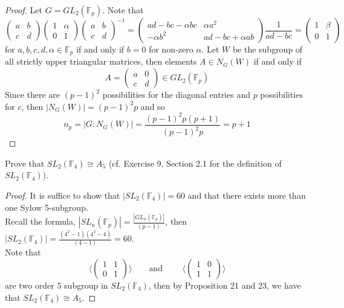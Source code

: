 \documentclass{article}
\newcommand{\F}{\mathbb{F}}
\newenvironment{problem}[2][Problem]{\begin{trivlist}
\item[\hskip \labelsep {\bfseries #1}\hskip \labelsep {\bfseries #2.}]}{\end{trivlist}}
\begin{document}
\begin{proof}
    Let $G=GL_2(\F_p)$. Note that 
    \[
    \begin{pmatrix}
        a & b \\
        c & d
    \end{pmatrix}
    \begin{pmatrix}
        1 & \alpha\\
        0 & 1
    \end{pmatrix}
    \begin{pmatrix}
        a & b\\
        c & d
    \end{pmatrix}^{-1}=\begin{pmatrix}
        ad-bc-\alpha bc & \alpha a^2\\
        -\alpha b^2 & ad-bc+\alpha ab
    \end{pmatrix}\frac{1}{ad-bc}= \begin{pmatrix}
        1 & \beta \\
        0 & 1
    \end{pmatrix}
    \]
    for $a, b, c, d, \alpha\in \F_p$ if and only if $b=0$ for non-zero $\alpha$. Let $W$ be the subgroup of all strictly upper triangular matrices, then elements 
    $A\in  N_{G}(W)$ if and only if 
    \[
        A=\begin{pmatrix}
            a & 0 \\
            c & d
        \end{pmatrix}\in GL_2(\F_p)
    \]
    Since there are $(p-1)^2$ possibilities for the diagonal entries and $p$ possibilities for $c$, then $|N_G(W)|=(p-1)^2p$ and so 
    \[
        n_p = |G:N_G(W)|=\frac{(p-1)^2p(p+1)}{(p-1)^2p}=p+1
    \]
\end{proof}
\begin{problem}{41}
    Prove that $SL_2(\mathbb{F}_4) \cong A_5$ (cf. Exercise 9, Section 2.1 for the definition of $SL_2(\mathbb{F}_4)$).
\end{problem}
\begin{proof}
    It is suffice to show that $|SL_2(\F_4)|=60$ and that there exists more than one Sylow 5-subgroup. \\
    Recall the formula, $|SL_n(\F_p)|=\frac{|GL_n(\F_p)|}{(p-1)}$, then $|SL_2(\F_4)|=\frac{(4^2-1)(4^2-4)}{(4-1)}=60$.\\
    Note that 
    \[
    \bigg\langle\begin{pmatrix}
        1 & 1\\
        0 & 1
    \end{pmatrix}\bigg\rangle\qquad\text{and }\qquad \bigg\langle\begin{pmatrix}
        1 & 0\\
        1 & 1
    \end{pmatrix}\bigg\rangle
    \]
    are two order 5 subgroup in $SL_2(\F_4)$, then by Proposition 21 and 23, we have that $SL_2(\F_4)\cong A_5$.
\end{proof}
\end{document}
